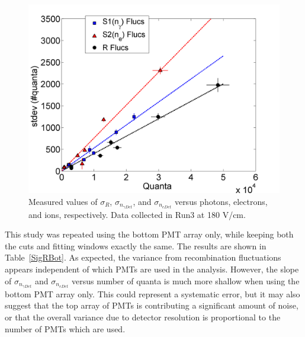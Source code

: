 \begin{figure}[H]
\centering
\includegraphics[scale=0.5]{QuantaFluctuations.png}
\caption{Measured values of $\sigma_{R}$, $\sigma_{n_{\gamma Det}}$, and $\sigma_{n_{e Det}}$ versus photons, electrons, and ions, respectively. Data collected in Run3 at 180 V/cm.}
\label{QuantaFluc}
\end{figure}

This study was repeated using the bottom PMT array only, while keeping both the cuts and fitting windows exactly the same.  The results are shown in Table~\ref{SigRBot}.  As expected, the variance from recombination fluctuations appears independent of which PMTs are used in the analysis.  However, the slope of $\sigma_{n_{\gamma Det}}$ and $\sigma_{n_{e Det}}$ versus number of quanta is much more shallow when using the bottom PMT array only.  This could represent a systematic error, but it may also suggest that the top array of PMTs is contributing a significant amount of noise, or that the overall variance due to detector resolution is proportional to the number of PMTs which are used.  

